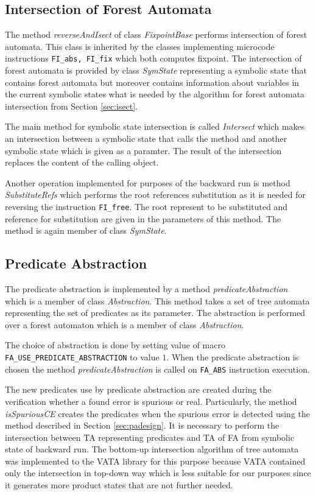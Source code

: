 \subsection{Intersection of Forest Automata}
\label{subsec:isectimpl}

The method \emph{reverseAndIsect} of class \emph{FixpointBase}
performs intersection of forest automata.
This class is inherited by the classes implementing microcode
instructions {\tt FI\_abs, FI\_fix} which both computes fixpoint.
The intersection of forest automata is provided by class \emph{SymState}
representing a symbolic state that contains forest automata
but moreover contains information about variables in the current
symbolic states what is needed by the algorithm for forest automata intersection
from Section \ref{sec:isect}.

The main method for symbolic state intersection is called \emph{Intersect}
which makes an intersection between a symbolic state that calls the method and
another symbolic state which is given as a paramter.
The result of the intersection replaces the content of the calling object.

Another operation implemented for purposes of the backward run is
method \emph{SubstituteRefs} which performs the root references
substitution as it is needed for reversing the instruction {\tt FI\_free}.
The root represent to be substituted and reference for substitution are
given in the parameters of this method.
The method is again member of class \emph{SymState}.

\subsection{Predicate Abstraction}
\label{subsec:paimpl}

The predicate abstraction is implemented by a method \emph{predicateAbstraction}
which is a member of class \emph{Abstraction}.
This method takes a set of tree automata representing the set of predicates
as its parameter.
The abstraction is performed over a forest automaton which is a member of
class \emph{Abstraction}.

The choice of abstraction is done by setting value of macro
{\tt FA\_USE\_PREDICATE\_ABSTRACTION} to value $1$.
When the predicate abstraction is chosen the method \emph{predicateAbstraction}
is called on {\tt FA\_ABS} instruction execution.

The new predicates use by predicate abstraction are created during
the verification whether a found error is spurious or real.
Particularly, the method \emph{isSpuriousCE} creates the predicates
when the spurious error is detected using the method described
in Section \ref{sec:padesign}.
It is necessary to perform the intersection between TA representing
predicates and TA of FA from symbolic state of backward run.
The bottom-up intersection algorithm of tree automata was implemented
to the VATA library for this purpose because VATA contained only the
intersection in top-down way which is less suitable for our purposes since
it generates more product states that are not further needed.

